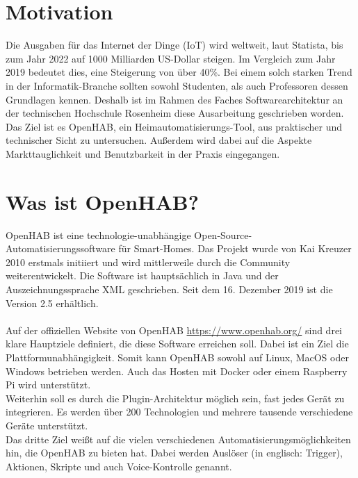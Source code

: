\section{Motivation}
{Die Ausgaben für das Internet der Dinge (IoT) wird weltweit, laut Statista, bis zum Jahr 2022 auf 1000 Milliarden US-Dollar steigen. Im Vergleich zum Jahr 2019 bedeutet dies, eine Steigerung von über 40\%.}\cite{STATISTA01:IOT} Bei einem solch starken Trend in der Informatik-Branche sollten sowohl Studenten, als auch Professoren dessen Grundlagen kennen.
Deshalb ist im Rahmen des Faches Softwarearchitektur an der technischen Hochschule Rosenheim diese Ausarbeitung geschrieben worden. Das Ziel ist es OpenHAB, ein Heimautomatisierungs-Tool, aus praktischer und technischer Sicht zu untersuchen. Außerdem wird dabei auf die Aspekte Markttauglichkeit und Benutzbarkeit in der Praxis eingegangen.

\section{Was ist OpenHAB?}
OpenHAB ist eine technologie-unabhängige Open-Source-Automatisierungssoftware für Smart-Homes.
Das Projekt wurde von Kai Kreuzer 2010 erstmals initiiert und wird mittlerweile durch die Community weiterentwickelt. Die Software ist hauptsächlich in Java und der Auszeichnungssprache XML geschrieben. Seit dem 16. Dezember 2019 ist die Version 2.5 erhältlich.\\
\\
Auf der offiziellen Website von OpenHAB \url{https://www.openhab.org/} sind drei klare Hauptziele definiert, die diese Software erreichen soll. Dabei ist ein Ziel die Plattformunabhängigkeit. Somit kann OpenHAB sowohl auf Linux, MacOS oder Windows betrieben werden. Auch das Hosten mit Docker oder einem Raspberry Pi wird unterstützt.\\
Weiterhin soll es durch die Plugin-Architektur möglich sein, fast jedes Gerät zu integrieren.
Es werden über 200 Technologien und mehrere tausende verschiedene Geräte unterstützt.\\
Das dritte Ziel weißt auf die vielen verschiedenen Automatisierungsmöglichkeiten hin, die OpenHAB zu bieten hat. Dabei werden Auslöser (in englisch: Trigger), Aktionen, Skripte und auch Voice-Kontrolle genannt.

